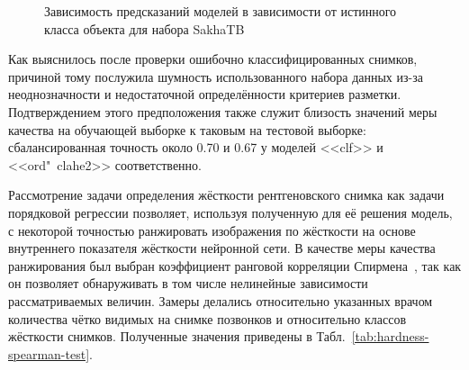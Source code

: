 \begin{figure}[ht]
	\caption{Зависимость предсказаний моделей в зависимости от истинного класса объекта для набора SakhaTB}
	\label{fig:hardness-class-separation}
\end{figure}

Как выяснилось после проверки ошибочно классифицированных снимков, причиной тому послужила шумность использованного набора данных из-за неоднозначности и недостаточной определённости критериев разметки. Подтверждением этого предположения также служит близость значений меры качества на обучающей выборке к таковым на тестовой выборке: сбалансированная точность около 0.70 и 0.67 у моделей <<clf>> и <<ord"~clahe2>> соответственно.

Рассмотрение задачи определения жёсткости рентгеновского снимка как задачи порядковой регрессии позволяет, используя полученную для её решения модель, с некоторой точностью ранжировать изображения по жёсткости на основе внутреннего показателя жёсткости нейронной сети. В качестве меры качества ранжирования был выбран коэффициент ранговой корреляции Спирмена~\cite{zwillinger1999crc}, так как он позволяет обнаруживать в том числе нелинейные зависимости рассматриваемых величин. Замеры делались относительно указанных врачом количества чётко видимых на снимке позвонков и относительно классов жёсткости снимков. Полученные значения приведены в Табл.~\ref{tab:hardness-spearman-test}.

